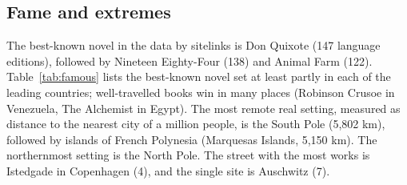 \documentclass[11pt,a4paper]{article}
\begin{document}
\subsection{Fame and extremes}
The best-known novel in the data by sitelinks is Don Quixote (147 language editions), followed by Nineteen Eighty-Four (138) and Animal Farm (122). Table~\ref{tab:famous} lists the best-known novel set at least partly in each of the leading countries; well-travelled books win in many places (Robinson Crusoe in Venezuela, The Alchemist in Egypt). The most remote real setting, measured as distance to the nearest city of a million people, is the South Pole (5,802 km), followed by islands of French Polynesia (Marquesas Islands, 5,150 km). The northernmost setting is the North Pole. The street with the most works is Istedgade in Copenhagen (4), and the single site is Auschwitz (7).
\end{document}

